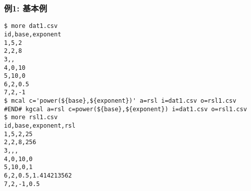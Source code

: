 \subsubsection*{例1: 基本例}



\begin{Verbatim}[baselinestretch=0.7,frame=single]
$ more dat1.csv
id,base,exponent
1,5,2
2,2,8
3,,
4,0,10
5,10,0
6,2,0.5
7,2,-1
$ mcal c='power(${base},${exponent})' a=rsl i=dat1.csv o=rsl1.csv
#END# kgcal a=rsl c=power(${base},${exponent}) i=dat1.csv o=rsl1.csv
$ more rsl1.csv
id,base,exponent,rsl
1,5,2,25
2,2,8,256
3,,,
4,0,10,0
5,10,0,1
6,2,0.5,1.414213562
7,2,-1,0.5
\end{Verbatim}
